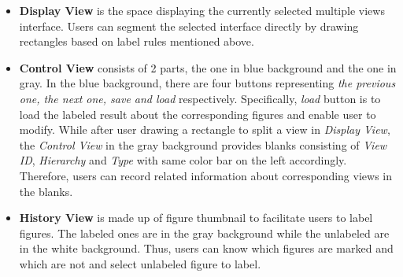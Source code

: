 \begin{itemize}
\item
\textbf{Display View} is the space displaying the currently selected multiple views interface.
Users can segment the selected interface directly by drawing rectangles based on label rules mentioned above.

\item
\textbf{Control View} consists of 2 parts, the one in blue background and the one in gray.
In the blue background, there are four buttons representing \textit{the previous one, the next one, save and load} respectively.
Specifically, \textit{load} button is to load the labeled result about the corresponding figures and enable user to modify.
While after user drawing a rectangle to split a view in \textit{Display View}, the \emph{Control View} in the gray background provides blanks consisting of \emph{View ID}, \emph{Hierarchy} and \emph{Type} with same color bar on the left accordingly.
Therefore, users can record related information about corresponding views in the blanks.

\item 
\textbf{History View} is made up of figure thumbnail to facilitate users to label figures.
The labeled ones are in the gray background while the unlabeled are in the white background.
Thus, users can know which figures are marked and which are not and select unlabeled figure to label.

\end{itemize}

